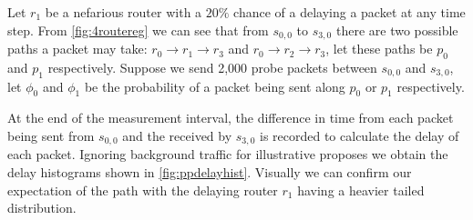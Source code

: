 Let $r_1$ be a nefarious router with a $20\%$ chance of a delaying a packet at any time step. From \cref{fig:4routereg} we can see that from $s_{0,0}$ to $s_{3,0}$ there are two possible paths a packet may take: $r_0\rightarrow r_1\rightarrow r_3$ and $r_0\rightarrow r_2\rightarrow r_3$, let these paths be $p_0$ and $p_1$ respectively. Suppose we send 2,000 probe packets between $s_{0,0}$ and $s_{3,0}$, let $\phi_0$ and $\phi_1$ be the probability of a packet being sent along $p_0$ or $p_1$ respectively.\par
At the end of the measurement interval, the difference in time from each packet being sent from $s_{0,0}$ and the received by $s_{3,0}$ is recorded to calculate the delay of each packet. Ignoring background traffic for illustrative proposes we obtain the delay histograms shown in \cref{fig:ppdelayhist}. Visually we can confirm our expectation of the path with the delaying router $r_1$ having a heavier tailed distribution.\par
